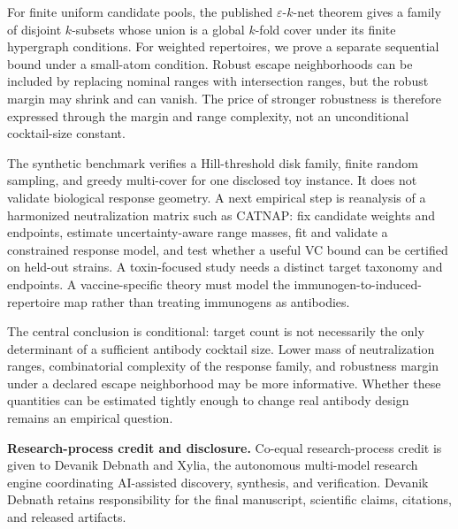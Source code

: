 \documentclass[11pt,a4paper]{article}
\newcommand{\eps}{\varepsilon}
\begin{document}
For finite uniform candidate pools, the published $\eps$-$k$-net theorem gives a family of disjoint $k$-subsets whose union is a global $k$-fold cover under its finite hypergraph conditions. For weighted repertoires, we prove a separate sequential bound under a small-atom condition. Robust escape neighborhoods can be included by replacing nominal ranges with intersection ranges, but the robust margin may shrink and can vanish. The price of stronger robustness is therefore expressed through the margin and range complexity, not an unconditional cocktail-size constant.

The synthetic benchmark verifies a Hill-threshold disk family, finite random sampling, and greedy multi-cover for one disclosed toy instance. It does not validate biological response geometry. A next empirical step is reanalysis of a harmonized neutralization matrix such as CATNAP: fix candidate weights and endpoints, estimate uncertainty-aware range masses, fit and validate a constrained response model, and test whether a useful VC bound can be certified on held-out strains. A toxin-focused study needs a distinct target taxonomy and endpoints. A vaccine-specific theory must model the immunogen-to-induced-repertoire map rather than treating immunogens as antibodies.

The central conclusion is conditional: target count is not necessarily the only determinant of a sufficient antibody cocktail size. Lower mass of neutralization ranges, combinatorial complexity of the response family, and robustness margin under a declared escape neighborhood may be more informative. Whether these quantities can be estimated tightly enough to change real antibody design remains an empirical question.

\par\medskip
\noindent\begin{minipage}{\linewidth}\footnotesize\textbf{Research-process credit and disclosure.} Co-equal research-process credit is given to Devanik Debnath and Xylia, the autonomous multi-model research engine coordinating AI-assisted discovery, synthesis, and verification. Devanik Debnath retains responsibility for the final manuscript, scientific claims, citations, and released artifacts.\end{minipage}
\end{document}
